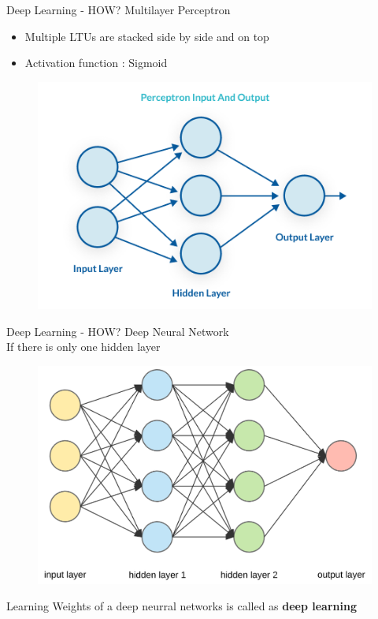 \begin{frame}[fragile]{Deep Learning - HOW?}
    Multilayer Perceptron
    \begin{itemize}
        \item Multiple LTUs are stacked side by side and on top
\pause        
        \item Activation function : Sigmoid
    \end{itemize}
    \begin{figure}[ht]
      \hspace*{-1cm}\includegraphics[width=0.5\linewidth]{mlp}
    \end{figure}
\end{frame}

\begin{frame}[fragile]{Deep Learning - HOW?}
    Deep Neural Network \\ 
    If there is only one hidden layer
    \begin{figure}[ht]
      \hspace*{-1cm}\includegraphics[width=0.5\linewidth]{dnn}
    \end{figure}
Learning Weights of a deep neurral networks is called as \textbf{deep learning}
\end{frame}

